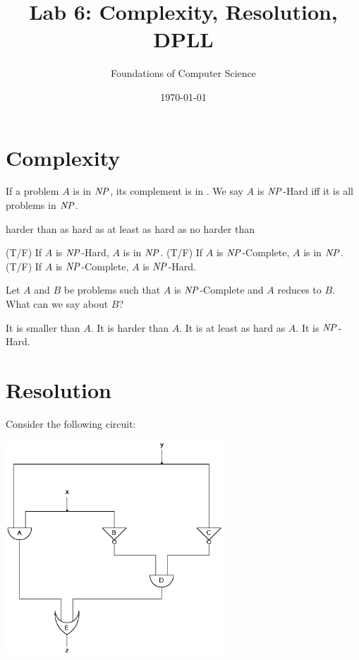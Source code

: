\documentclass[]{exam}
\title{Lab 6: Complexity, Resolution, DPLL}
\author{Foundations of Computer Science}
\date{\today}
\newcommand{\tf}[1][{}]{%
\fillin[#1][0.25in]%
}
\begin{document}
\maketitle

\setlength{\columnseprule}{1pt}
\begin{questions} 
\section*{Complexity}
\question If a problem $A$ is in $\mbox{\it NP\/}$, its complement is in \fillin[$\id{CoNP}$].
\question We say $A$ is $\mbox{\it NP\/}$-Hard iff it is \fillin all problems in $\mbox{\it NP\/}$.
\begin{checkboxes}
\choice harder than
\choice as hard as
\CorrectChoice at least as hard as
\choice no harder than
\end{checkboxes}

\question \tf[F] (T/F) If $A$ is $\mbox{\it NP\/}$-Hard, $A$ is in $\mbox{\it NP\/}$.
\question \tf[T] (T/F) If $A$ is $\mbox{\it NP\/}$-Complete, $A$ is in $\mbox{\it NP\/}$.
\question \tf[T] (T/F) If $A$ is $\mbox{\it NP\/}$-Complete, $A$ is $\mbox{\it NP\/}$-Hard.

\question Let $A$ and $B$ be problems such that $A$ is $\mbox{\it NP\/}$-Complete
and $A$ reduces to $B$. What can we say about $B$?
\begin{checkboxes}
\choice It is smaller than $A$.
\choice It is harder than $A$.
\CorrectChoice It is at least as hard as $A$.
\CorrectChoice It is $\mbox{\it NP\/}$-Hard.
\end{checkboxes}

\clearpage
\section*{Resolution}

\question Consider the following circuit:
\begin{center}
\includegraphics[height=8cm]{equiv_circuit.eps}%
\end{center}


\end{questions}
\end{document}
